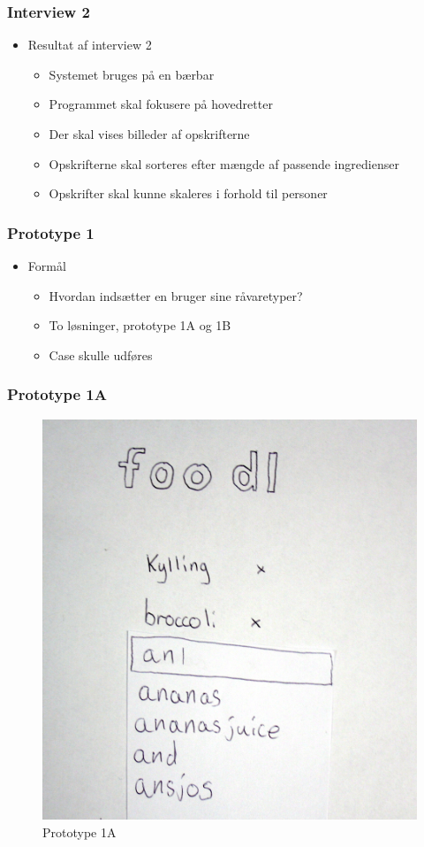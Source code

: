 \begin{frame}
\frametitle{Interview 2}
	\begin{itemize}
	\item Resultat af interview 2
			\begin{itemize}
			\item Systemet bruges på en bærbar
			\item Programmet skal fokusere på hovedretter
			\item Der skal vises billeder af opskrifterne
			\item Opskrifterne skal sorteres efter mængde af passende ingredienser
			\item Opskrifter skal kunne skaleres i forhold til personer
			\end{itemize} 
	\end{itemize}
\end{frame}

\begin{frame}
\frametitle{Prototype 1}
	\begin{itemize}
	\item Formål
			\begin{itemize}
			\item Hvordan indsætter en bruger sine råvaretyper?
			\item To løsninger, prototype 1A og 1B
			\item Case skulle udføres
			\end{itemize} 
	\end{itemize}
\end{frame}


\begin{frame}
	\frametitle{Prototype 1A}
	\begin{figure}
	\centering
	\includegraphics[scale=0.08]{billeder/prototype1a.jpg}
	\caption{Prototype 1A}
	\end{figure}
\end{frame}

